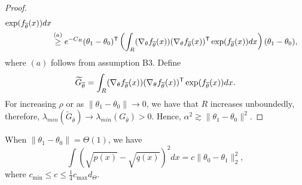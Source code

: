 \documentclass{article}
\begin{document}
\begin{proof}
\begin{align*}
          \exp(f_{\overline{\theta}}(x)) dx \\
  &\stackrel{(a)}\geq e^{- C_R}  (\theta_1 - \theta_0)^{\mathsf{T}} 
                \left( \int_{R} ( \nabla_{\theta} f_{\overline{\theta}}(x) ) 
                                      ( \nabla_{\theta} f_{\overline{\theta}}(x) )^{\mathsf{T}}
                          \exp(f_{\overline{\theta}}(x)) dx \right) (\theta_1 - \theta_0),
\end{align*}
where $(a)$ follows from assumption B3. Define 
\[
\widetilde{G}_{\overline{\theta}} =  \int_{R} ( \nabla_{\theta} f_{\overline{\theta}}(x) ) 
                                      ( \nabla_{\theta} f_{\overline{\theta}}(x) )^{\mathsf{T}}
                          \exp(f_{\overline{\theta}}(x)) dx.
\]
For increasing $\rho$ or as $\| \theta_1 - \theta_0 \| \rightarrow 0$, we have that $R$ increases unboundedly, therefore,
$\lambda_{min}(\tilde{G}_{\bar \theta}) \rightarrow \lambda_{min}(G_{\bar \theta}) > 0$. Hence, $\alpha^2 \gtrsim \| \theta_1 - \theta_0 \|^2$.
\end{proof}




\begin{lemma}
\label{lem:hellinger_theta_equivalence}
When $\| \theta_1 - \theta_0 \| = \Theta(1)$, we have
\[
\int (\sqrt{p(x)} - \sqrt{q(x)})^2 dx = c \| \theta_0 - \theta_1 \|_2^2,
\]
where $ c_{\min} \leq c \leq \frac{1}{4} c_{\max} d_{\Theta} $.
\end{lemma}
\end{document}
